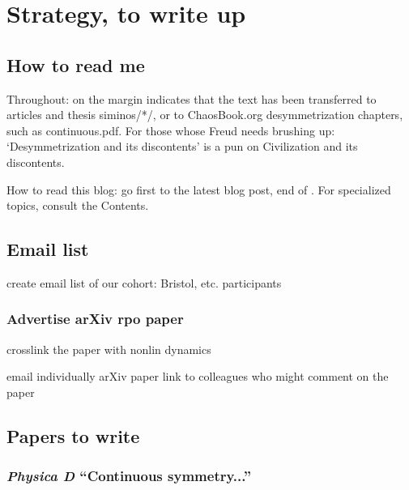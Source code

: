 
\chapter{Strategy, to write up}

\section{How to read me}

Throughout:  {\textdollar} on the margin
{\steady}
indicates that the text has been transferred to
articles and thesis siminos/*/,  or to ChaosBook.org desymmetrization
chapters, such as
{continuous.pdf}.
%
For those whose Freud needs brushing up:
`Desymmetrization and its discontents' is a pun
on 
{Civilization and its discontents}.

How to read this blog: go first to the latest blog post, end
of . For specialized topics, consult the
Contents.


\section{Email list}

create email list of our cohort:  Bristol, etc. participants

\subsection{Advertise arXiv rpo paper}

crosslink the paper with nonlin dynamics

email individually arXiv paper link to colleagues who might comment
    on the paper



\section{Papers to write}

\subsection{\emph{Physica D} ``Continuous symmetry...''}

